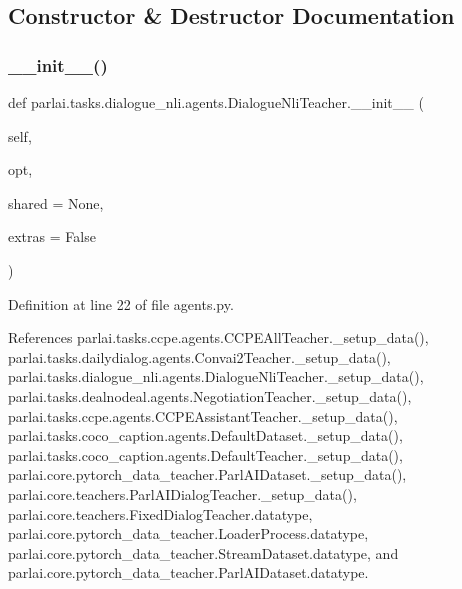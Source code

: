 \subsection{Constructor \& Destructor Documentation}
\mbox{\label{classparlai_1_1tasks_1_1dialogue__nli_1_1agents_1_1DialogueNliTeacher_ab6931a1fbc88ffc407f35ba72cc44b76}} 
\subsubsection{\texorpdfstring{\+\_\+\+\_\+init\+\_\+\+\_\+()}{\_\_init\_\_()}}
{\footnotesize\ttfamily def parlai.\+tasks.\+dialogue\+\_\+nli.\+agents.\+Dialogue\+Nli\+Teacher.\+\_\+\+\_\+init\+\_\+\+\_\+ (\begin{DoxyParamCaption}\item[{}]{self,  }\item[{}]{opt,  }\item[{}]{shared = {\ttfamily None},  }\item[{}]{extras = {\ttfamily False} }\end{DoxyParamCaption})}



Definition at line 22 of file agents.\+py.



References parlai.\+tasks.\+ccpe.\+agents.\+C\+C\+P\+E\+All\+Teacher.\+\_\+setup\+\_\+data(), parlai.\+tasks.\+dailydialog.\+agents.\+Convai2\+Teacher.\+\_\+setup\+\_\+data(), parlai.\+tasks.\+dialogue\+\_\+nli.\+agents.\+Dialogue\+Nli\+Teacher.\+\_\+setup\+\_\+data(), parlai.\+tasks.\+dealnodeal.\+agents.\+Negotiation\+Teacher.\+\_\+setup\+\_\+data(), parlai.\+tasks.\+ccpe.\+agents.\+C\+C\+P\+E\+Assistant\+Teacher.\+\_\+setup\+\_\+data(), parlai.\+tasks.\+coco\+\_\+caption.\+agents.\+Default\+Dataset.\+\_\+setup\+\_\+data(), parlai.\+tasks.\+coco\+\_\+caption.\+agents.\+Default\+Teacher.\+\_\+setup\+\_\+data(), parlai.\+core.\+pytorch\+\_\+data\+\_\+teacher.\+Parl\+A\+I\+Dataset.\+\_\+setup\+\_\+data(), parlai.\+core.\+teachers.\+Parl\+A\+I\+Dialog\+Teacher.\+\_\+setup\+\_\+data(), parlai.\+core.\+teachers.\+Fixed\+Dialog\+Teacher.\+datatype, parlai.\+core.\+pytorch\+\_\+data\+\_\+teacher.\+Loader\+Process.\+datatype, parlai.\+core.\+pytorch\+\_\+data\+\_\+teacher.\+Stream\+Dataset.\+datatype, and parlai.\+core.\+pytorch\+\_\+data\+\_\+teacher.\+Parl\+A\+I\+Dataset.\+datatype.

